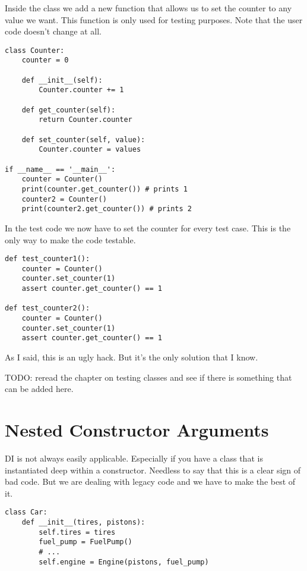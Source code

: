 Inside the class  we add a new function  that allows us to set the counter to any value we want. This function is only used for testing purposes. Note that the user code doesn't change at all.

\begin{programcode}{}
\begin{verbatim}
class Counter:
    counter = 0

    def __init__(self):
        Counter.counter += 1

    def get_counter(self):
        return Counter.counter

    def set_counter(self, value):
        Counter.counter = values

if __name__ == '__main__':
    counter = Counter()
    print(counter.get_counter()) # prints 1
    counter2 = Counter()
    print(counter2.get_counter()) # prints 2
\end{verbatim}
\end{programcode}

In the test code we now have to set the counter for every test case. This is the only way to make the code testable.

\begin{programcode}{}
\begin{verbatim}
def test_counter1():
    counter = Counter()
    counter.set_counter(1)
    assert counter.get_counter() == 1

def test_counter2():
    counter = Counter()
    counter.set_counter(1)
    assert counter.get_counter() == 1
\end{verbatim}
\end{programcode}

As I said, this is an ugly hack. But it's the only solution that I know.

TODO: reread the chapter on testing classes and see if there is something that can be added here.

\section{Nested Constructor Arguments}

DI is not always easily applicable. Especially if you have a class that is instantiated deep within a constructor. Needless to say that this is a clear sign of bad code. But we are dealing with legacy code and we have to make the best of it.

\begin{programcode}{}
\begin{verbatim}
class Car:
    def __init__(tires, pistons):
        self.tires = tires
        fuel_pump = FuelPump()
        # ...
        self.engine = Engine(pistons, fuel_pump)
\end{verbatim}
\end{programcode}

